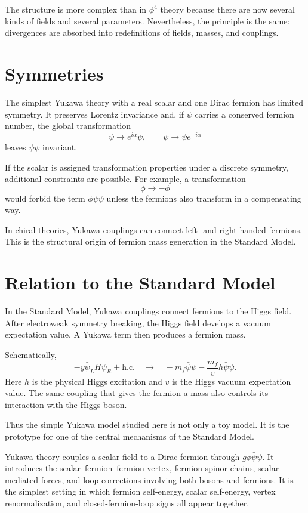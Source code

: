 The structure is more complex than in \(\phi^4\) theory because there are now
several kinds of fields and several parameters. Nevertheless, the principle is
the same: divergences are absorbed into redefinitions of fields, masses, and
couplings.

\section{Symmetries}

The simplest Yukawa theory with a real scalar and one Dirac fermion has limited
symmetry. It preserves Lorentz invariance and, if \(\psi\) carries a conserved
fermion number, the global transformation
\[
    \psi\longrightarrow e^{i\alpha}\psi,
    \qquad
    \bar\psi\longrightarrow \bar\psi e^{-i\alpha}
\]
leaves \(\bar\psi\psi\) invariant.

If the scalar is assigned transformation properties under a discrete symmetry,
additional constraints are possible. For example, a transformation
\[
    \phi\longrightarrow -\phi
\]
would forbid the term \(\phi\bar\psi\psi\) unless the fermions also transform in
a compensating way.

In chiral theories, Yukawa couplings can connect left- and right-handed fermions.
This is the structural origin of fermion mass generation in the Standard Model.

\section{Relation to the Standard Model}

In the Standard Model, Yukawa couplings connect fermions to the Higgs field.
After electroweak symmetry breaking, the Higgs field develops a vacuum
expectation value. A Yukawa term then produces a fermion mass.

Schematically,
\[
    -y\bar\psi_L H\psi_R+\mathrm{h.c.}
    \quad\longrightarrow\quad
    -m_f\bar\psi\psi
      -\frac{m_f}{v}h\bar\psi\psi.
\]
Here \(h\) is the physical Higgs excitation and \(v\) is the Higgs vacuum
expectation value. The same coupling that gives the fermion a mass also controls
its interaction with the Higgs boson.

Thus the simple Yukawa model studied here is not only a toy model. It is the
prototype for one of the central mechanisms of the Standard Model.

\begin{summarybox}
Yukawa theory couples a scalar field to a Dirac fermion through
\(g\phi\bar\psi\psi\). It introduces the scalar--fermion--fermion vertex,
fermion spinor chains, scalar-mediated forces, and loop corrections involving
both bosons and fermions. It is the simplest setting in which fermion self-energy,
scalar self-energy, vertex renormalization, and closed-fermion-loop signs all
appear together.
\end{summarybox}

